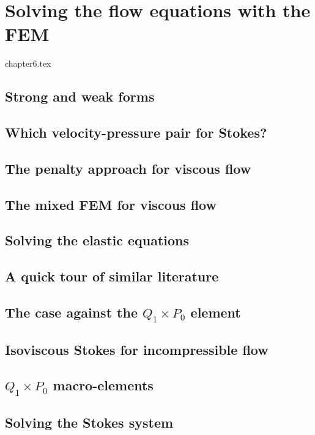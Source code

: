 \chapter{Solving the flow equations with the FEM} \label{solvingFEM} %

\begin{flushright} {\tiny {\color{gray} chapter6.tex}} \end{flushright}

\section{Strong and weak forms}  %
\section{Which velocity-pressure pair for Stokes?}\label{ss:pair} %

\newpage
\section{The penalty approach for viscous flow}\label{sec:penalty} %
\newpage
\section{The mixed FEM for viscous flow} \label{sec:mixed}  %
\newpage
\section{Solving the elastic equations}  %
\section{A quick tour of similar literature}  %
\section{The case against the $Q_1\times P_0$ element}  %
\section{Isoviscous Stokes for incompressible flow}\label{ss:isovisc}  %
\section{$Q_1\times P_0$ macro-elements} \label{ss:meshtopos}  %
\newpage
\section{Solving the Stokes system \label{sec:solvers}}  %
